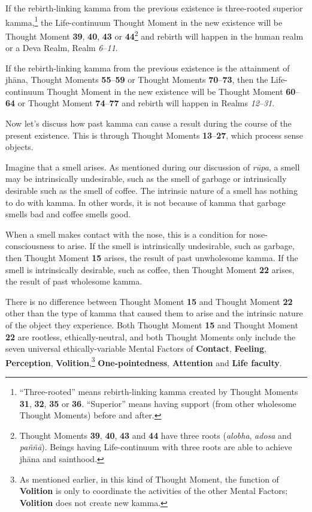 If the rebirth-linking kamma from the previous existence is three-rooted superior kamma,\footnote{“Three-rooted” means rebirth-linking kamma created by Thought Moments \textbf{31}, \textbf{32}, \textbf{35} or \textbf{36}. “Superior” means having support (from other wholesome Thought Moments) before and after.} the Life-continuum Thought Moment in the new existence will be Thought Moment \textbf{39}, \textbf{40}, \textbf{43} or \textbf{44}\footnote{Thought Moments \textbf{39}, \textbf{40}, \textbf{43} and \textbf{44} have three roots (\textit{alobha}, \textit{adosa} and \textit{paññā}). Beings having Life-continuum with three roots are able to achieve jhāna and sainthood.} and rebirth will happen in the human realm or a Deva Realm, Realm \textit{6}--\textit{11}.

If the rebirth-linking kamma from the previous existence is the attainment of jhāna, Thought Moments \textbf{55}--\textbf{59} or Thought Moments \textbf{70}--\textbf{73}, then the Life-continuum Thought Moment in the new existence will be Thought Moment \textbf{60}--\textbf{64} or Thought Moment \textbf{74}--\textbf{77} and rebirth will happen in Realms \textit{12}--\textit{31}.

Now let’s discuss how past kamma can cause a result during the course of the present existence. This is through Thought Moments \textbf{13}--\textbf{27}, which process sense objects.

Imagine that a smell arises. As mentioned during our discussion of \textit{rūpa}, a smell may be intrinsically undesirable, such as the smell of garbage or intrinsically desirable such as the smell of coffee. The intrinsic nature of a smell has nothing to do with kamma. In other words, it is not because of kamma that garbage smells bad and coffee smells good.

When a smell makes contact with the nose, this is a condition for nose-consciousness to arise. If the smell is intrinsically undesirable, such as garbage, then Thought Moment \textbf{15} arises, the result of past unwholesome kamma. If the smell is intrinsically desirable, such as coffee, then Thought Moment \textbf{22} arises, the result of past wholesome kamma.

There is no difference between Thought Moment \textbf{15} and Thought Moment \textbf{22} other than the type of kamma that caused them to arise and the intrinsic nature of the object they experience. Both Thought Moment \textbf{15} and Thought Moment \textbf{22} are rootless, ethically-neutral, and both Thought Moments only include the seven universal ethically-variable Mental Factors of \textbf{Contact}, \textbf{Feeling}, \textbf{Perception}, \textbf{Volition},\footnote{As mentioned earlier, in this kind of Thought Moment, the function of \textbf{Volition} is only to coordinate the activities of the other Mental Factors; \textbf{Volition} does not create new kamma.} \textbf{One-pointedness}, \textbf{Attention} and \textbf{Life faculty}.

